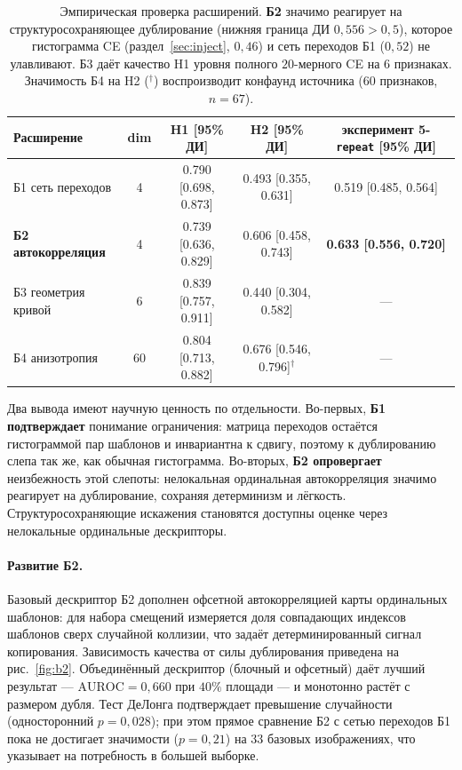 \documentclass[14pt]{extarticle}
\theoremstyle{plain}
\numberwithin{equation}{section}
\numberwithin{figure}{section}
\numberwithin{table}{section}
\begin{document}
\begin{table}[h!]
\centering
\caption{Эмпирическая проверка расширений. \textbf{Б2} значимо реагирует на
структуросохраняющее дублирование (нижняя граница ДИ $0{,}556>0{,}5$), которое
гистограмма CE (раздел~\ref{sec:inject}, $0{,}46$) и сеть переходов Б1 ($0{,}52$)
не улавливают. Б3 даёт качество H1 уровня полного $20$-мерного CE на $6$
признаках. Значимость Б4 на H2 ($^{\dagger}$) воспроизводит конфаунд источника
($60$ признаков, $n=67$).}
\label{tab:novel}
\begin{tabular}{@{}lcccc@{}}
\toprule
Расширение & dim & H1 [95\% ДИ] & H2 [95\% ДИ] & эксперимент 5-\texttt{repeat} [95\% ДИ] \\
\midrule
Б1 сеть переходов        & 4  & 0.790 [0.698, 0.873] & 0.493 [0.355, 0.631] & 0.519 [0.485, 0.564] \\
\textbf{Б2 автокорреляция} & 4  & 0.739 [0.636, 0.829] & 0.606 [0.458, 0.743] & \textbf{0.633 [0.556, 0.720]} \\
Б3 геометрия кривой      & 6  & 0.839 [0.757, 0.911] & 0.440 [0.304, 0.582] & --- \\
Б4 анизотропия           & 60 & 0.804 [0.713, 0.882] & 0.676 [0.546, 0.796]$^{\dagger}$ & --- \\
\bottomrule
\end{tabular}

\end{table}

Два вывода имеют научную ценность по отдельности. Во-первых, \textbf{Б1
подтверждает} понимание ограничения: матрица переходов остаётся гистограммой пар
шаблонов и инвариантна к сдвигу, поэтому к дублированию слепа так же, как обычная
гистограмма. Во-вторых, \textbf{Б2 опровергает} неизбежность этой слепоты:
нелокальная ординальная автокорреляция значимо реагирует на дублирование,
сохраняя детерминизм и лёгкость. Структуросохраняющие искажения становятся
доступны оценке через нелокальные ординальные дескрипторы.

\paragraph{Развитие Б2.} Базовый дескриптор Б2 дополнен офсетной автокорреляцией
карты ординальных шаблонов: для набора смещений измеряется доля совпадающих
индексов шаблонов сверх случайной коллизии, что задаёт детерминированный сигнал
копирования. Зависимость качества от силы дублирования приведена на
рис.~\ref{fig:b2}. Объединённый дескриптор (блочный и офсетный) даёт лучший
результат — $\mathrm{AUROC}=0{,}660$ при $40\%$ площади — и монотонно растёт с
размером дубля. Тест ДеЛонга \citep{delong1988comparing,sun2014fast} подтверждает
превышение случайности (односторонний $p=0{,}028$); при этом прямое сравнение Б2 с
сетью переходов Б1 пока не достигает значимости ($p=0{,}21$) на $33$ базовых
изображениях, что указывает на потребность в большей выборке.
\end{document}
